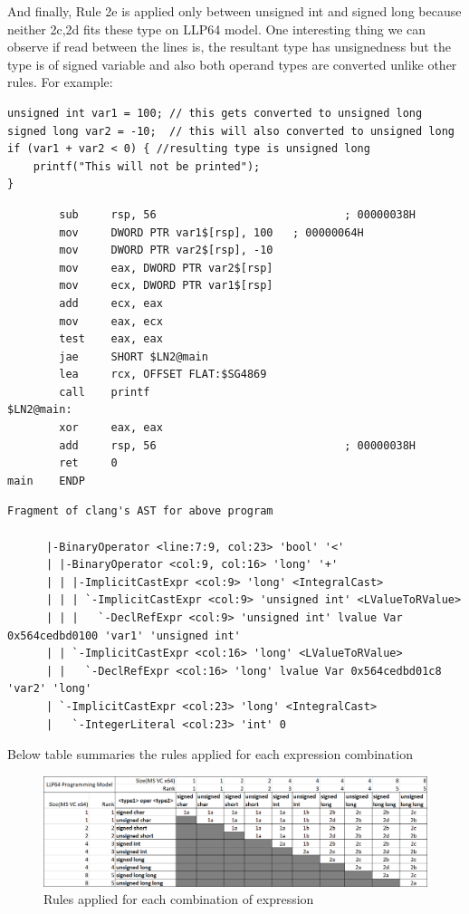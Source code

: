 \documentclass{article}
\begin{document}
And finally, Rule 2e is applied only between unsigned int and signed long
because neither 2c,2d fits these type on LLP64 model. One interesting thing we
can observe if read between the lines is, the resultant type has unsignedness
but the type is of signed variable and also both operand types are converted
unlike other rules.
For example:
\begin{verbatim}
unsigned int var1 = 100; // this gets converted to unsigned long
signed long var2 = -10;  // this will also converted to unsigned long
if (var1 + var2 < 0) { //resulting type is unsigned long
    printf("This will not be printed");
}
\end{verbatim}
\begin{verbatim}
        sub     rsp, 56                             ; 00000038H
        mov     DWORD PTR var1$[rsp], 100   ; 00000064H
        mov     DWORD PTR var2$[rsp], -10
        mov     eax, DWORD PTR var2$[rsp]
        mov     ecx, DWORD PTR var1$[rsp]
        add     ecx, eax
        mov     eax, ecx
        test    eax, eax
        jae     SHORT $LN2@main
        lea     rcx, OFFSET FLAT:$SG4869
        call    printf
$LN2@main:
        xor     eax, eax
        add     rsp, 56                             ; 00000038H
        ret     0
main    ENDP
\end{verbatim}
\begin{verbatim}
Fragment of clang's AST for above program

      |-BinaryOperator <line:7:9, col:23> 'bool' '<'
      | |-BinaryOperator <col:9, col:16> 'long' '+'
      | | |-ImplicitCastExpr <col:9> 'long' <IntegralCast>
      | | | `-ImplicitCastExpr <col:9> 'unsigned int' <LValueToRValue>
      | | |   `-DeclRefExpr <col:9> 'unsigned int' lvalue Var 0x564cedbd0100 'var1' 'unsigned int'
      | | `-ImplicitCastExpr <col:16> 'long' <LValueToRValue>
      | |   `-DeclRefExpr <col:16> 'long' lvalue Var 0x564cedbd01c8 'var2' 'long'
      | `-ImplicitCastExpr <col:23> 'long' <IntegralCast>
      |   `-IntegerLiteral <col:23> 'int' 0
\end{verbatim}

Below table summaries the rules applied for each expression combination
\begin{figure}[H]
\centering
\includegraphics[width=\textwidth]{Integer-Arithmetic-All-Datatypes.png}
\caption{Rules applied for each combination of expression}
\end{figure}
\end{document}
